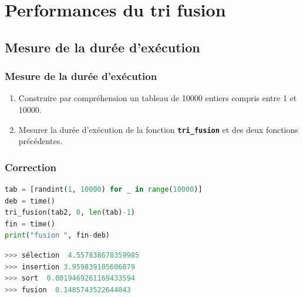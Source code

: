 \documentclass[svgnames,11pt]{beamer}
\begin{document}
\section{Performances du tri fusion}
\subsection{Mesure de la durée d'exécution}
\begin{frame}
    \frametitle{Mesure de la durée d'exécution}

    \begin{activite}
        \begin{enumerate}
            \item Construire par compréhension un tableau de 10000 entiers compris entre 1 et 10000.
            \item Mesurer la durée d'exécution de la fonction \textbf{\texttt{tri\_fusion}} et des deux fonctions précédentes.
        \end{enumerate}
    \end{activite}

\end{frame}
\begin{frame}[fragile]
    \frametitle{Correction}

    \begin{center}
        \begin{lstlisting}[language=Python , basicstyle=\ttfamily\small, xleftmargin=2em, xrightmargin=2em]
tab = [randint(1, 10000) for _ in range(10000)]
deb = time()
tri_fusion(tab2, 0, len(tab)-1)
fin = time()
print("fusion ", fin-deb)
\end{lstlisting}
        \begin{lstlisting}[language=Python , basicstyle=\ttfamily\small, xleftmargin=2em, xrightmargin=2em]
>>> sélection  4.557838678359985
>>> insertion 3.959839105606079
>>> sort  0.0019469261169433594
>>> fusion  0.1485743522644043
\end{lstlisting}
    \end{center}

\end{frame}
\end{document}
